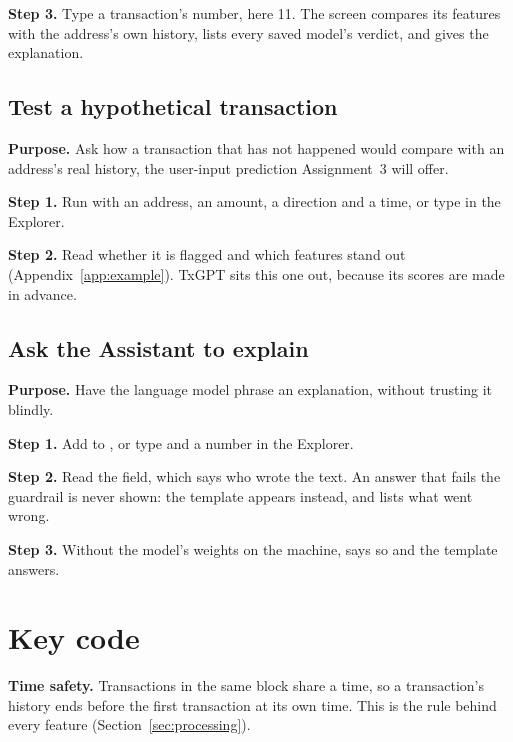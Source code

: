 {\fontsize{7}{8.6}\selectfont}

\noindent\begin{minipage}{\linewidth}
\textbf{Step 3.} Type a transaction's number, here 11. The screen compares its features with the address's own history,
lists every saved model's verdict, and gives the explanation.

{\fontsize{5}{6.4}\selectfont}
\end{minipage}

\subsection*{Test a hypothetical transaction}

\textbf{Purpose.} Ask how a transaction that has not happened would compare with an address's real history, the
user-input prediction Assignment~3 will offer.

\textbf{Step 1.} Run  with an address, an amount, a direction and a time, or type  in the
Explorer.

\textbf{Step 2.} Read whether it is flagged and which features stand out (Appendix~\ref{app:example}). TxGPT sits this
one out, because its scores are made in advance.

\subsection*{Ask the Assistant to explain}

\textbf{Purpose.} Have the language model phrase an explanation, without trusting it blindly.

\textbf{Step 1.} Add  to , or type  and a number in the Explorer.

\textbf{Step 2.} Read the  field, which says who wrote the text. An answer that fails the guardrail is never
shown: the template appears instead, and  lists what went wrong.

\textbf{Step 3.} Without the model's weights on the machine,  says so and the template answers.

\section{Key code}
\label{app:code}

\textbf{Time safety.} Transactions in the same block share a time, so a transaction's history ends before the first
transaction at its own time. This is the rule behind every feature (Section~\ref{sec:processing}).


